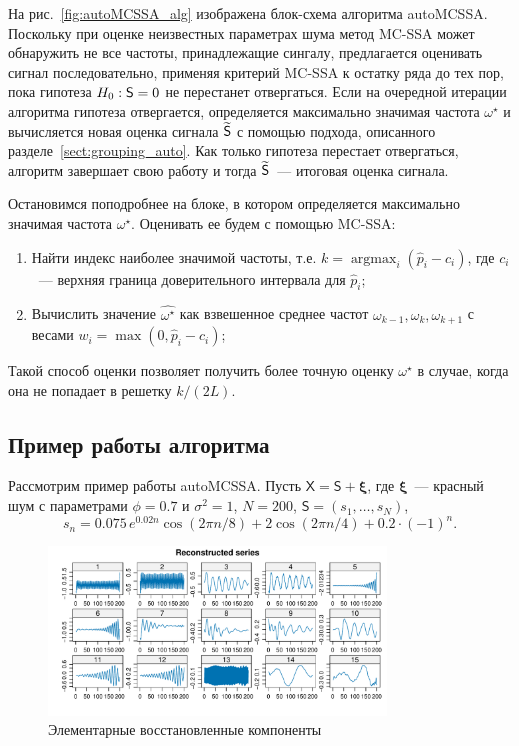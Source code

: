 \documentclass[specialist,
substylefile = spbu_report.rtx,
subf,href,colorlinks=true, 12pt]{disser}
\theoremstyle{definition}
\begin{document}
На рис.~\ref{fig:autoMCSSA_alg} изображена блок-схема алгоритма autoMCSSA. Поскольку при оценке неизвестных параметрах шума метод MC-SSA может обнаружить не все частоты, принадлежащие сингалу, предлагается оценивать сигнал последовательно, применяя критерий MC-SSA к остатку ряда до тех пор, пока гипотеза $H_0:\mathsf{S}=0$ не перестанет отвергаться. Если на очередной итерации алгоритма гипотеза отвергается, определяется максимально значимая частота $\omega^\star$ и вычисляется новая оценка сигнала $\widetilde{\mathsf{S}}$ с помощью подхода, описанного разделе~\ref{sect:grouping_auto}. Как только гипотеза перестает отвергаться, алгоритм завершает свою работу и тогда $\widetilde{\mathsf{S}}$~--- итоговая оценка сигнала.

Остановимся поподробнее на блоке, в котором определяется максимально значимая частота $\omega^\star$. Оценивать ее будем с помощью MC-SSA:
\begin{enumerate}
	\item Найти индекс наиболее значимой частоты, т.е. $k=\operatorname{argmax}_i(\widehat{p}_i-c_i)$, где $c_i$~--- верхняя граница доверительного интервала для $\widehat{p}_i$;
	\item Вычислить значение $\widehat{\omega^\star}$ как взвешенное среднее частот $\omega_{k-1}, \omega_k,\omega_{k+1}$ с весами $w_i=\max(0, \widehat{p}_i-c_i)$;
\end{enumerate}
Такой способ оценки позволяет получить более точную оценку $\omega^\star$ в случае, когда она не попадает в решетку $k/(2L)$.

\subsection{Пример работы алгоритма}\label{sect:autoMCSSA_example}

Рассмотрим пример работы autoMCSSA. Пусть $\mathsf{X}=\mathsf{S}+\bm{\xi}$, где $\bm\xi$~--- красный шум с параметрами $\phi=0.7$ и $\sigma^2=1$, $N=200$, $\mathsf{S}=(s_1,\ldots, s_N)$,
\[
	s_n=0.075\, e^{0.02n}\cos(2\pi n/8) + 2\cos(2\pi n / 4) + 0.2\cdot(-1)^n.
\]

\begin{figure}[!h]
	\centering
	\includegraphics[width=0.8\textwidth]{img/reconstructed_ts.pdf}
	\caption{Элементарные восстановленные компоненты}
	\label{fig:reconstructed_ts}
\end{figure}
\end{document}
